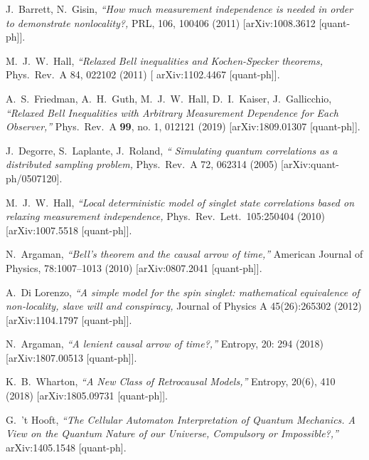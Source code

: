 \documentclass[12pt]{article}
\begin{document}
\begin{thebibliography}{99}
J.~Barrett, N.~Gisin, {\sl ``How much measurement independence is needed in order to demonstrate nonlocality?,} PRL, 106, 100406 (2011) [arXiv:1008.3612 [quant-ph]].

M.~J.~W.~Hall, {\sl ``Relaxed Bell inequalities and Kochen-Specker theorems,} Phys.\ Rev.\ A 84, 022102 (2011) [	arXiv:1102.4467 [quant-ph]].
 


  A.~S.~Friedman, A.~H.~Guth, M.~J.~W.~Hall, D.~I.~Kaiser, J.~Gallicchio,
  {\sl ``Relaxed Bell Inequalities with Arbitrary Measurement Dependence for Each Observer,''}
  Phys.\ Rev.\ A {\bf 99}, no. 1, 012121 (2019)
  [arXiv:1809.01307 [quant-ph]].

J.~Degorre, S.~Laplante, J.~Roland,  {\sl ``  Simulating quantum correlations as a distributed sampling problem,} Phys.\ Rev.\ A 72, 062314 (2005) [arXiv:quant-ph/0507120].

 M.~J.~W.~Hall, {\sl ``Local deterministic model of singlet state correlations based on relaxing measurement independence,} Phys.\ Rev.\ Lett.\ 105:250404 (2010) 
[arXiv:1007.5518 [quant-ph]].

 N.~Argaman, {\sl ``Bell’s theorem and the causal arrow of time,''}
American Journal of Physics, 78:1007–1013 (2010) [arXiv:0807.2041 [quant-ph]].

A.~Di Lorenzo, {\sl ``A simple model for the spin singlet: mathematical equivalence of non-locality, slave will and conspiracy,} Journal of Physics A
45(26):265302 (2012) [arXiv:1104.1797 [quant-ph]].

 N.~Argaman, {\sl ``A lenient causal arrow of time?,''} Entropy, 20:
294 (2018) [arXiv:1807.00513 [quant-ph]].
 
 K.~B.~Wharton, {\sl ``A New Class of Retrocausal Models,''} Entropy, 20(6), 410 (2018) [arXiv:1805.09731 [quant-ph]].

  G.~'t Hooft,
  {\sl ``The Cellular Automaton Interpretation of Quantum Mechanics. A View on the Quantum Nature of our Universe, Compulsory or Impossible?,''}
  arXiv:1405.1548 [quant-ph].
  

\end{thebibliography}
\end{document}
